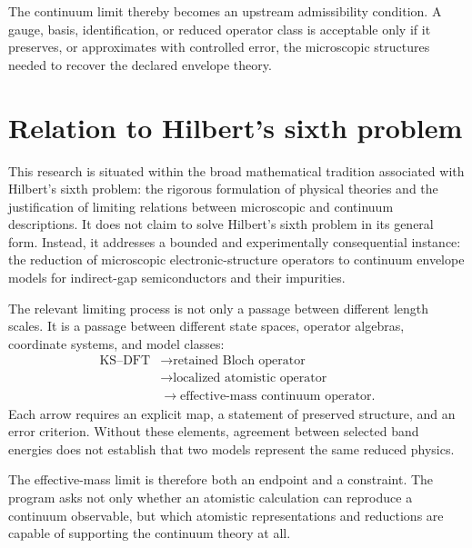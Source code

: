 The continuum limit thereby becomes an upstream admissibility condition. A
gauge, basis, identification, or reduced operator class is acceptable only if
it preserves, or approximates with controlled error, the microscopic structures
needed to recover the declared envelope theory.

\section{Relation to Hilbert's sixth problem}


This research is situated within the broad mathematical tradition associated
with Hilbert's sixth problem: the rigorous formulation of physical theories and
the justification of limiting relations between microscopic and continuum
descriptions. It does not claim to solve Hilbert's sixth problem in its general
form. Instead, it addresses a bounded and experimentally consequential
instance: the reduction of microscopic electronic-structure operators to
continuum envelope models for indirect-gap semiconductors and their impurities.


The relevant limiting process is not only a passage between different length
scales. It is a passage between different state spaces, operator algebras,
coordinate systems, and model classes:
\begin{equation}
    \begin{aligned}
        \text{KS--DFT}
        &\longrightarrow \text{retained Bloch operator}\\
        &\longrightarrow \text{localized atomistic operator}\\
        &\longrightarrow \text{effective-mass continuum operator}.
    \end{aligned}
\end{equation}
Each arrow requires an explicit map, a statement of preserved structure, and an
error criterion. Without these elements, agreement between selected band
energies does not establish that two models represent the same reduced physics.

The effective-mass limit is therefore both an endpoint and a constraint. The
program asks not only whether an atomistic calculation can reproduce a
continuum observable, but which atomistic representations and reductions are
capable of supporting the continuum theory at all.

